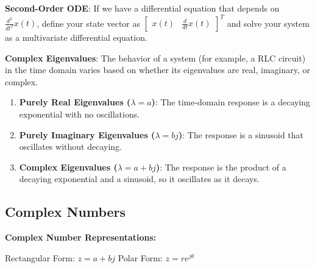 \textbf{Second-Order ODE}: If we have a differential equation that depends on $\frac{d^2}{dt^2} x(t)$, define your state vector as $\begin{bmatrix} x(t) & \frac{d}{dt} x(t) \end{bmatrix}^T$ and solve your system as a multivariate differential equation.

\textbf{Complex Eigenvalues}: The behavior of a system (for example, a RLC circuit) in the time domain varies based on whether its eigenvalues are real, imaginary, or complex.
\begin{enumerate}
    \item \textbf{Purely Real Eigenvalues ($\lambda = a$)}: The time-domain response is a decaying exponential with no oscillations.
    \item \textbf{Purely Imaginary Eigenvalues ($\lambda = bj$)}: The response is a sinusoid that oscillates without decaying.
    \item \textbf{Complex Eigenvalues ($\lambda = a + bj$)}: The response is the product of a decaying exponential and a sinusoid, so it oscillates as it decays.
\end{enumerate}

\newpage
\subsection*{Complex Numbers}
\textbf{Complex Number Representations:} 

\hspace{2 em} Rectangular Form: $z = a + bj$ \hspace{14em} Polar Form: $z = re^{j\theta}$

